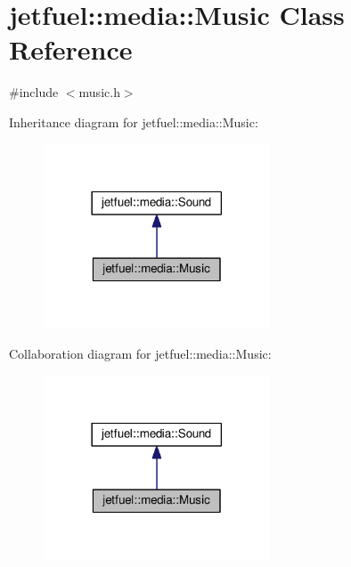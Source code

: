 \hypertarget{classjetfuel_1_1media_1_1Music}{}\section{jetfuel\+:\+:media\+:\+:Music Class Reference}
\label{classjetfuel_1_1media_1_1Music}


{\ttfamily \#include $<$music.\+h$>$}



Inheritance diagram for jetfuel\+:\+:media\+:\+:Music\+:
\nopagebreak
\begin{figure}[H]
\begin{center}
\leavevmode
\includegraphics[width=189pt]{classjetfuel_1_1media_1_1Music__inherit__graph}
\end{center}
\end{figure}


Collaboration diagram for jetfuel\+:\+:media\+:\+:Music\+:
\nopagebreak
\begin{figure}[H]
\begin{center}
\leavevmode
\includegraphics[width=189pt]{classjetfuel_1_1media_1_1Music__coll__graph}
\end{center}
\end{figure}
